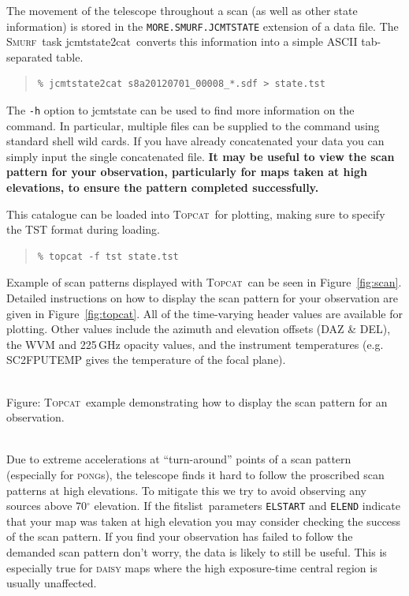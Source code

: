 \documentclass[twoside,11pt]{article}
\newcommand{\htmladdnormallink}[2]{#1}
\newcommand{\htmladdimg}[1]{}
\newcommand{\htmlref}[2]{#1}
\newcommand{\latexhtml}[2]{#1}
\newcommand{\xref}[3]{#1}
\renewcommand{\_}{\texttt{\symbol{95}}}
\newenvironment{myquote}{\begin{quote}\begin{small}}{\end{small}\end{quote}}
\newcommand{\smurf}{\xref{\textsc{Smurf}}{sun258}{}}
\newcommand{\topcat}{\htmladdnormallink{\textsc{Topcat}}{http://www.starlink.ac.uk/topcat}}
\newcommand{\task}[1]{\textsf{#1}}
\newcommand{\param}[1]{\texttt{#1}}
\newcommand{\jcmtstate}{\xref{\task{jcmtstate2cat}}{sun258}{JCMTSTATE2CAT}}
\newcommand{\fitslist}{\xref{\task{fitslist}}{sun95}{FITSLIST}}
\newcommand{\cref}[3]{\latexhtml{#1~\ref{#2}}{\htmlref{#3}{#2}}}
\begin{document}
The movement of the telescope throughout a scan (as well as other
state information) is stored in the \texttt{MORE.SMURF.JCMTSTATE}
extension of a data file. The \smurf\ task \jcmtstate\ converts this
information into a simple ASCII tab-separated table.

\begin{myquote}
\begin{verbatim}
% jcmtstate2cat s8a20120701_00008_*.sdf > state.tst
\end{verbatim}
\end{myquote}

The \texttt{-h} option to \task{jcmtstate} can be used to find more
information on the command. In particular, multiple files can be supplied
to the command using standard shell wild cards. If you have already
concatenated your data you can simply input the single concatenated
file. \textbf{It may be useful to view the scan pattern for your
observation, particularly for maps taken at high elevations, to ensure
the pattern completed successfully.}

This catalogue can be loaded into \topcat\ for plotting, making sure
to specify the TST format during loading.

\begin{myquote}
\begin{verbatim}
% topcat -f tst state.tst
\end{verbatim}
\end{myquote}

Example of scan patterns displayed with \topcat\ can be seen in
\cref{Figure}{fig:scan}{telescope tracks}. Detailed instructions on
how to display the scan pattern for your observation are given in
\cref{Figure}{fig:topcat}{box below}.
All of the time-varying header values are available for plotting. Other
values include the azimuth and elevation offsets (DAZ \& DEL), the WVM
and 225\,GHz opacity values, and the instrument temperatures (e.g.
SC2\_FPUTEMP gives the temperature of the focal plane).

\begin{htmlonly}
 \label{fig:topcat} \htmladdimg{sc21_topcat_example.png}
 \\
 Figure: \topcat\ example demonstrating how to display the scan
 pattern for an observation.\\ \\
\end{htmlonly}

Due to extreme accelerations at ``turn-around'' points of a scan
pattern (especially for \textsc{pong}s), the telescope finds it hard
to follow the proscribed scan patterns at high elevations. To mitigate
this we try to avoid observing any sources above 70$^\circ$ elevation.
If the \fitslist\ parameters \param{ELSTART} and \param{ELEND}
indicate that your map was taken at high elevation you may consider
checking the success of the scan pattern. If you find your observation
has failed to follow the demanded scan pattern don't worry, the data is
likely to still be useful. This is especially true for \textsc{daisy}
maps where the high exposure-time central region is usually
unaffected.
\end{document}
